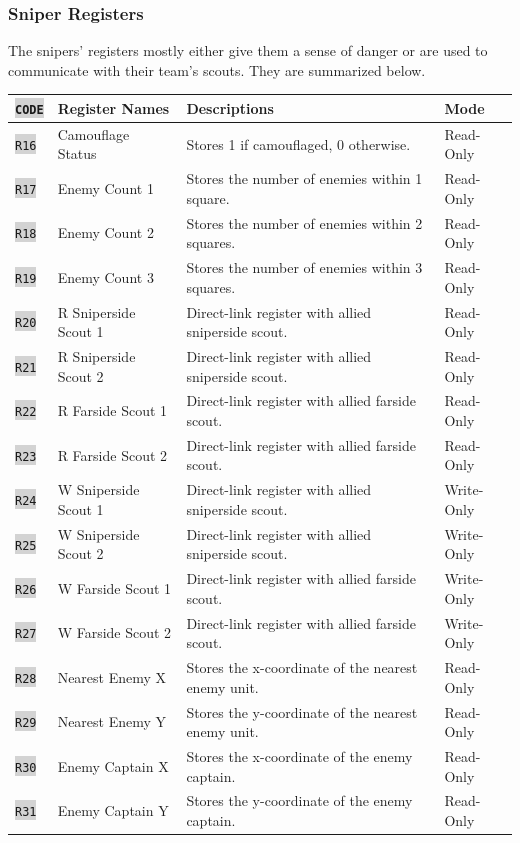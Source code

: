 \documentclass{article}
\newcommand{\vnscode}[1]{\colorbox{lightgray}{\lstinline[language=vns]{#1}}}
\begin{document}
\subsubsection{Sniper Registers}

The snipers' registers mostly either give them a sense of danger or are used to
communicate with their team's scouts. They are summarized below.

\begin{minipage}{\textwidth}
\centering
\begin{tabular}{llll}
    \hline \vnscode{CODE} & Register Names & Descriptions & Mode \\ \hline
    \vnscode{R16} & Camouflage Status & Stores 1 if camouflaged, 0 otherwise. & Read-Only \\
    \vnscode{R17} & Enemy Count 1 & Stores the number of enemies within 1 square. & Read-Only \\
    \vnscode{R18} & Enemy Count 2 & Stores the number of enemies within 2 squares. & Read-Only \\
    \vnscode{R19} & Enemy Count 3 & Stores the number of enemies within 3 squares. & Read-Only \\
    \vnscode{R20} & R Sniperside Scout 1 & Direct-link register with allied sniperside scout. & Read-Only \\
    \vnscode{R21} & R Sniperside Scout 2 & Direct-link register with allied sniperside scout. & Read-Only \\
    \vnscode{R22} & R Farside Scout 1 & Direct-link register with allied farside scout. & Read-Only \\
    \vnscode{R23} & R Farside Scout 2 & Direct-link register with allied farside scout. & Read-Only \\
    \vnscode{R24} & W Sniperside Scout 1 & Direct-link register with allied sniperside scout. & Write-Only \\
    \vnscode{R25} & W Sniperside Scout 2 & Direct-link register with allied sniperside scout. & Write-Only \\
    \vnscode{R26} & W Farside Scout 1 & Direct-link register with allied farside scout. & Write-Only \\
    \vnscode{R27} & W Farside Scout 2 & Direct-link register with allied farside scout. & Write-Only \\
    \vnscode{R28} & Nearest Enemy X & Stores the x-coordinate of the nearest enemy unit. & Read-Only \\
    \vnscode{R29} & Nearest Enemy Y & Stores the y-coordinate of the nearest enemy unit. & Read-Only \\
    \vnscode{R30} & Enemy Captain X & Stores the x-coordinate of the enemy captain. & Read-Only \\
    \vnscode{R31} & Enemy Captain Y & Stores the y-coordinate of the enemy captain. & Read-Only \\
\end{tabular}
\end{minipage}
\end{document}
